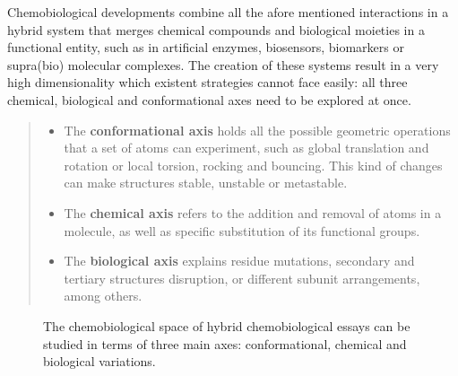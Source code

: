 Chemobiological developments combine all the afore mentioned interactions in a hybrid system that merges chemical compounds and biological moieties in a functional entity, such as in artificial enzymes, biosensors, biomarkers or supra(bio) molecular complexes. The creation of these systems result in a very high dimensionality which existent strategies cannot face easily: all three chemical, biological and conformational axes need to be explored at once.
%
\begin{quote}
%
\begin{itemize}

\item The \textbf{conformational axis} holds all the possible geometric operations that a set of atoms can experiment, such as global translation and rotation or local torsion, rocking and bouncing. This kind of changes can make structures stable, unstable or metastable.

\item The \textbf{chemical axis} refers to the addition and removal of atoms in a molecule, as well as specific substitution of its functional groups.

\item The \textbf{biological axis} explains residue mutations, secondary and tertiary structures disruption, or different subunit arrangements, among others.

\end{itemize}

\end{quote}
\begin{figure}
\noindent{}
\caption[A highly dimensional search space]{The chemobiological space of hybrid chemobiological essays can be studied in terms of three main axes: conformational, chemical and biological variations.}
\end{figure}

